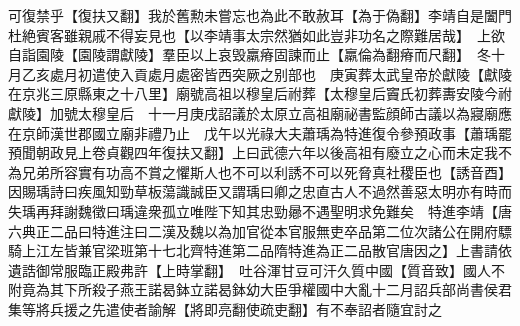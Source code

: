可復禁乎【復扶又翻】我於舊勲未嘗忘也為此不敢赦耳【為于偽翻】李靖自是闔門杜絶賓客雖親戚不得妄見也【以李靖事太宗然猶如此豈非功名之際難居哉】　上欲自詣園陵【園陵謂獻陵】羣臣以上哀毁羸瘠固諫而止【羸倫為翻瘠而尺翻】　冬十月乙亥處月初遣使入貢處月處密皆西突厥之别部也　庚寅葬太武皇帝於獻陵【獻陵在京兆三原縣東之十八里】廟號高祖以穆皇后祔葬【太穆皇后竇氏初葬夀安陵今祔獻陵】加號太穆皇后　十一月庚戌詔議於太原立高祖廟祕書監顔師古議以為寢廟應在京師漢世郡國立廟非禮乃止　戊午以光祿大夫蕭瑀為特進復令參預政事【蕭瑀罷預聞朝政見上卷貞觀四年復扶又翻】上曰武德六年以後高祖有廢立之心而未定我不為兄弟所容實有功高不賞之懼斯人也不可以利誘不可以死脅真社稷臣也【誘音酉】因賜瑀詩曰疾風知勁草板蕩識誠臣又謂瑀曰卿之忠直古人不過然善惡太明亦有時而失瑀再拜謝魏徵曰瑀違衆孤立唯陛下知其忠勁曏不遇聖明求免難矣　特進李靖【唐六典正二品曰特進注曰二漢及魏以為加官從本官服無吏卒品第二位次諸公在開府驃騎上江左皆兼官梁班第十七北齊特進第二品隋特進為正二品散官唐因之】上書請依遺誥御常服臨正殿弗許【上時掌翻】　吐谷渾甘豆可汗久質中國【質音致】國人不附竟為其下所殺子燕王諾曷鉢立諾曷鉢幼大臣爭權國中大亂十二月詔兵部尚書侯君集等將兵援之先遣使者諭解【將即亮翻使疏吏翻】有不奉詔者隨宜討之

